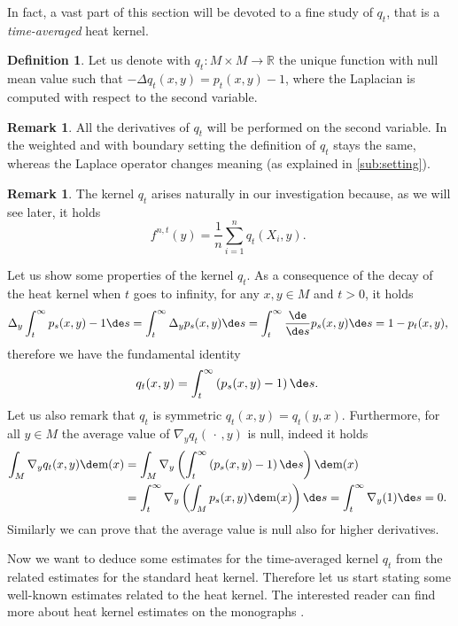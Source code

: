 \documentclass[JEP,XML,SOM,Unicode]{cedram}
\newcounter{results}[section]
\theoremstyle{plain}
\theoremstyle{definition}
\newtheorem{remark}[results]{Remark}
\newtheorem{definition}[results]{Definition}
\numberwithin{equation}{section}
\newcommand{\RR}{\ensuremath{\mathbb R}}
\newcommand{\emptyparam}{\ensuremath{\,\cdot\,}}
\newcommand{\lapl}{\ensuremath{\Delta}}
\renewcommand{\comma}{\ensuremath{\text{, }}}
\newcommand{\comma}{\ensuremath{\text{, }}}
\newcommand{\fullstop}{\ensuremath{\text{. }}}
\newcommand{\m}{\ensuremath{\mathrm m}}
\begin{document}
In fact, a vast part of this section will be devoted to a fine study of $q_t$, that is
a \emph{time-averaged} heat kernel.
\begin{definition}
Let us denote with $q_t:M\times M\to\RR$ the unique function with null mean value such that
$-\lapl q_t(x,y) = p_t(x,y)-1$, where the Laplacian is computed with respect to the second variable.
\end{definition}

\begin{remark}
All the derivatives of $q_t$ will be performed on the second variable.
In the weighted and with boundary setting the definition of $q_t$ stays the same,
whereas the Laplace operator changes meaning (as explained in \cref{sub:setting}).
\end{remark}
\begin{remark}
The kernel $q_t$ arises naturally in our investigation because, as we will see later, it holds
\begin{equation*}
f^{n,t}(y) = \frac1n\sum_{i=1}^n q_t(X_i, y)\fullstop
\end{equation*}
\end{remark}

Let us show some properties of the kernel $q_t$.
As a consequence of the decay of the heat kernel when $t$ goes to infinity, for any $x,y\in M$ and $t>0$, it holds
\begin{equation*}
\lapl_y \int_t^{\infty} p_s(x,y)-1\de s = \int_t^{\infty} \lapl_y p_s(x,y)\de s
= \int_t^{\infty} \frac{\de}{\de s} p_s(x,y)\de s = 1 - p_t(x,y) \comma
\end{equation*}
therefore we have the fundamental identity
\begin{equation}\label{eq:q_expr}
q_t(x,y) = \int_t^{\infty}\left(p_s(x,y)-1\right)\de s \fullstop
\end{equation}
Let us also remark that $q_t$ is symmetric $q_t(x,y) = q_t(y, x)$.
Furthermore, for all $y\in M$ the average value of $\nabla_y q_t(\emptyparam, y)$ is null, indeed it holds
\begin{align*}
\int_M \nabla_y q_t(x, y)\de\m(x)
&= \int_M \nabla_y\left(\int_t^{\infty}\left(p_s(x,y)-1\right)\de s\right)\de\m(x) \\
&= \int_t^{\infty}\nabla_y\left(\int_M p_s(x,y)\de\m(x)\right)\de s
= \int_t^{\infty}\nabla_y(1) \de s = 0 \fullstop
\end{align*}
Similarly we can prove that the average value is null also for higher derivatives.

Now we want to deduce some estimates for the time-averaged kernel $q_t$ from the related estimates for
the standard heat kernel.
Therefore let us start stating some well-known estimates related to the heat kernel. The interested reader
can find more about heat kernel estimates on the monographs \cite{saloff2010,grigor1999}.
\end{document}
